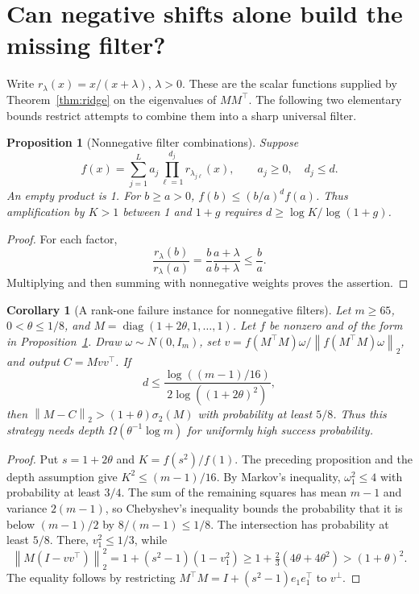 \documentclass[11pt]{article}
\newtheorem{proposition}[theorem]{Proposition}
\newtheorem{corollary}[theorem]{Corollary}
\theoremstyle{remark}
\newcommand{\norm}[1]{\left\lVert#1\right\rVert}
\newcommand{\diag}{\operatorname{diag}}
\begin{document}
\section{Can negative shifts alone build the missing filter?}
Write \(r_\lambda(x)=x/(x+\lambda)\), \(\lambda>0\).
These are the scalar functions supplied by Theorem~\ref{thm:ridge} on
the eigenvalues of \(MM^\top\). The following two elementary bounds
restrict attempts to combine them into a sharp universal filter.

\begin{proposition}[Nonnegative filter combinations]\label{prop:positive}
Suppose
\[
 f(x)=\sum_{j=1}^L a_j\prod_{\ell=1}^{d_j}r_{\lambda_{j\ell}}(x),
 \qquad a_j\geq0,\quad d_j\leq d.
\]
An empty product is 1. For \(b\geq a>0\),
\(f(b)\leq(b/a)^d f(a)\). Thus amplification by \(K>1\) between
1 and \(1+g\) requires
\(d\geq\log K/\log(1+g)\).
\end{proposition}
\begin{proof}
For each factor,
\[
 \frac{r_\lambda(b)}{r_\lambda(a)}
 =\frac ba\frac{a+\lambda}{b+\lambda}\leq\frac ba.
\]
Multiplying and then summing with nonnegative weights proves the assertion.
\end{proof}

\begin{corollary}[A rank-one failure instance for nonnegative filters]
Let \(m\geq65\), \(0<\theta\leq1/8\), and
\(M=\diag(1+2\theta,1,\ldots,1)\). Let \(f\) be nonzero and of the
form in Proposition~\ref{prop:positive}. Draw \(\omega\sim N(0,I_m)\),
set \(v=f(M^\top M)\omega/\norm{f(M^\top M)\omega}_2\), and output
\(C=Mvv^\top\). If
\[
 d\leq\frac{\log((m-1)/16)}{2\log((1+2\theta)^2)},
\]
then \(\norm{M-C}_2>(1+\theta)\sigma_2(M)\) with probability at
least \(5/8\). Thus this strategy needs depth
\(\Omega(\theta^{-1}\log m)\) for uniformly high success probability.
\end{corollary}
\begin{proof}
Put \(s=1+2\theta\) and \(K=f(s^2)/f(1)\). The preceding proposition
and the depth assumption give \(K^2\leq(m-1)/16\).
By Markov's inequality, \(\omega_1^2\leq4\) with probability at least
\(3/4\). The sum of the remaining squares has mean \(m-1\) and variance
\(2(m-1)\), so Chebyshev's inequality bounds the probability that it
is below \((m-1)/2\) by \(8/(m-1)\leq1/8\). The intersection has
probability at least \(5/8\). There, \(v_1^2\leq1/3\), while
\[
 \norm{M(I-vv^\top)}_2^2
 =1+(s^2-1)(1-v_1^2)
 \geq1+\tfrac23(4\theta+4\theta^2)>(1+\theta)^2.
\]
The equality follows by restricting
\(M^\top M=I+(s^2-1)e_1e_1^\top\) to \(v^\perp\).
\end{proof}
\end{document}
